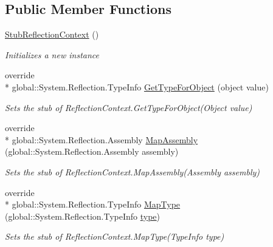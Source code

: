 \subsection*{Public Member Functions}
\begin{DoxyCompactItemize}
\item 
\hyperlink{class_system_1_1_reflection_1_1_fakes_1_1_stub_reflection_context_a86ef065a000247d10e44c94015ab566b}{Stub\-Reflection\-Context} ()
\begin{DoxyCompactList}\small\item\em Initializes a new instance\end{DoxyCompactList}\item 
override \\*
global\-::\-System.\-Reflection.\-Type\-Info \hyperlink{class_system_1_1_reflection_1_1_fakes_1_1_stub_reflection_context_a01c77c05761c9ca0e5935c87917735a7}{Get\-Type\-For\-Object} (object value)
\begin{DoxyCompactList}\small\item\em Sets the stub of Reflection\-Context.\-Get\-Type\-For\-Object(\-Object value)\end{DoxyCompactList}\item 
override \\*
global\-::\-System.\-Reflection.\-Assembly \hyperlink{class_system_1_1_reflection_1_1_fakes_1_1_stub_reflection_context_abc5461c6971778fb011fe9af4c21434c}{Map\-Assembly} (global\-::\-System.\-Reflection.\-Assembly assembly)
\begin{DoxyCompactList}\small\item\em Sets the stub of Reflection\-Context.\-Map\-Assembly(\-Assembly assembly)\end{DoxyCompactList}\item 
override \\*
global\-::\-System.\-Reflection.\-Type\-Info \hyperlink{class_system_1_1_reflection_1_1_fakes_1_1_stub_reflection_context_af14d083927e9c0d809f8ece64ab7753d}{Map\-Type} (global\-::\-System.\-Reflection.\-Type\-Info \hyperlink{jquery-1_810_82-vsdoc_8js_a3940565e83a9bfd10d95ffd27536da91}{type})
\begin{DoxyCompactList}\small\item\em Sets the stub of Reflection\-Context.\-Map\-Type(\-Type\-Info type)\end{DoxyCompactList}\end{DoxyCompactItemize}
